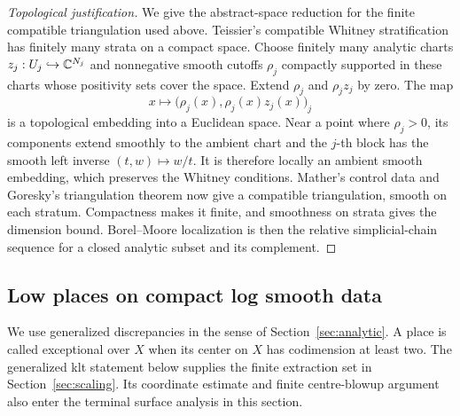 \begin{proof}[Topological justification]
We give the abstract-space reduction for the finite compatible
triangulation used above.  Teissier's compatible Whitney stratification
\cite[Chapter~III, Propositions~1.5 and~2.2.2]{Teissier1982} has finitely
many strata on a compact space.  Choose finitely many analytic charts
$z_j:U_j\hookrightarrow\mathbb C^{N_j}$ and nonnegative smooth cutoffs
$\rho_j$ compactly supported in these charts whose positivity sets
cover the space.  Extend $\rho_j$ and $\rho_j z_j$ by zero.  The map
\[
 x\longmapsto\bigl(\rho_j(x),\rho_j(x)z_j(x)\bigr)_j
\]
is a topological embedding into a Euclidean space.  Near a point where
$\rho_j>0$, its components extend smoothly to the ambient chart and the
$j$-th block has the smooth left inverse $(t,w)\mapsto w/t$.
It is therefore locally an ambient smooth embedding, which preserves
the Whitney conditions.  Mather's control data
\cite[Section~7, Proposition~7.1, and Section~8]{Mather1970} and
Goresky's triangulation theorem \cite[Section~5]{Goresky1978} now give
a compatible triangulation, smooth on each stratum.  Compactness makes
it finite, and smoothness on strata gives the dimension bound.
Borel--Moore localization is then the relative simplicial-chain
sequence for a closed analytic subset and its complement.
\end{proof}

\subsection{Low places on compact log smooth data}

We use generalized discrepancies in the sense of
Section~\ref{sec:analytic}.  A place is called exceptional over $X$ when
its center on $X$ has codimension at least two.
The generalized klt statement below supplies the finite extraction set in
Section~\ref{sec:scaling}.  Its coordinate estimate and finite centre-blowup
argument also enter the terminal surface analysis in this section.

